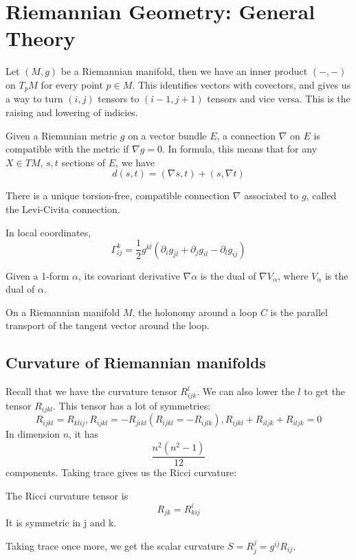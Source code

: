 \documentclass[main.tex]{subfiles}
\begin{document}
\section{Riemannian Geometry: General Theory}
Let $(M, g)$ be a Riemannian manifold, then we have an inner product 
$(-,-)$ on $T_p M$ for every point $p \in M$. This identifies vectors with covectors, and gives us a way to turn $(i, j)$ tensors to $(i-1, j+1)$ tensors and vice versa. This is the raising and lowering of indicies.

Given a Riemnnian metric $g$ on a vector bundle $E$, a connection $\nabla$ on $E$ is compatible with the metric if $\nabla g = 0$. In formula, this means that for any $X \in TM$, $s, t$ sections of $E$, we have 
$$
d(s,t) = (\nabla s, t) + (s, \nabla t)
$$

\begin{definition}
There is a unique torsion-free, compatible connection $\nabla$ associated to $g$, called the Levi-Civita connection.
\end{definition}
In local coordinates, 
$$
\Gamma_{ij}^k = \frac{1}{2} g^{kl}(\partial_i g_{jl} + \partial_j g_{il} - \partial_l g_{ij})
$$
\begin{remark}
Given a 1-form $\alpha$, its covariant derivative $\nabla \alpha$ is the dual of $\nabla V_\alpha$, where $V_\alpha$ is the dual of $\alpha$.
\end{remark}

\begin{remark}
On a Riemannian manifold $M$, the holonomy around a loop $C$ is the parallel transport of the tangent vector around the loop.
\end{remark}

\subsection{Curvature of Riemannian manifolds}
Recall that we have the curvature tensor $R_{ijk}^l$. We can also lower the $l$ to get the tensor $R_{ijkl}$. This tensor has a lot of symmetries:
$$
R_{ijkl} = R_{klij}, R_{ijkl} = -R_{jikl} (R_{ijkl} = - R_{ijlk}), R_{ijkl} + R_{iljk} + R_{iljk} = 0
$$
In dimension $n$, it has 
$$
\frac{n^2 (n^2 - 1)}{12}
$$
components.
Taking trace gives us the Ricci curvature:
\begin{definition}
The Ricci curvature tensor is 
$$
R_{jk} = R^i _{kij}
$$
It is symmetric in j and k. 
\end{definition}

Taking trace once more, we get the scalar curvature
$S = R^j _j = g^{ij} R_{ij}$.
\end{document}
